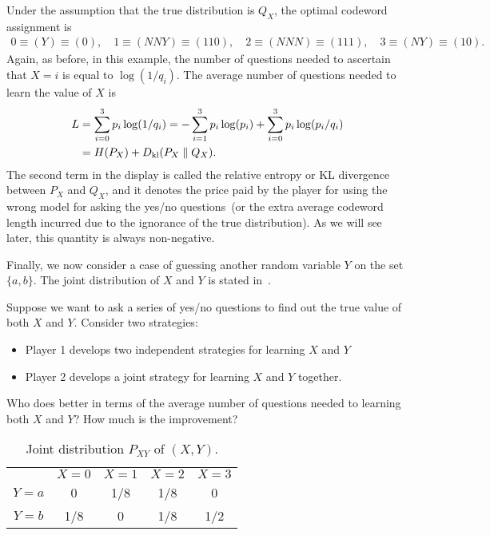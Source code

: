         Under the assumption that the true distribution is $Q_X$, the optimal codeword assignment is 
        \begin{align}
            0 \equiv (Y) \equiv (0), \quad 
            1 \equiv (NNY) \equiv (110), \quad 
            2 \equiv (NNN) \equiv (111), \quad 
            3 \equiv (NY) \equiv (10). 
        \end{align}
        Again, as before, in this example, the number of questions needed to ascertain that $X=i$ is equal to $\log(1/q_i)$. The average number of questions needed to learn the value of $X$ is 
        \begin{align}
            L &= \sum_{i=0}^3 p_i \log(1/q_i) = - \sum_{i=1}^3 p_i\log(p_i) +  \sum_{i=0}^3 p_i \log(p_i/q_i)  \\
            & = H(P_X) + D_{\text{kl}}(P_X \parallel Q_X). 
        \end{align}
        The second term in the display is called the relative entropy or KL divergence between $P_X$ and $Q_X$, and it denotes the price paid by the player for using the wrong model for asking the yes/no questions~(or the extra average codeword length incurred due to the ignorance of the true distribution). As we will see later, this quantity is always non-negative. 

        \begin{question}
            \label{question:guessing-game-IV} Finally, we now consider a case of guessing another random variable $Y$ on the set $\{a, b\}$. The joint distribution of $X$ and $Y$ is stated in~.  

            Suppose we want to ask a series of yes/no questions to find out the true value of both $X$ and $Y$. Consider two strategies: 
            \begin{itemize}
                \item Player 1 develops two  independent strategies for learning $X$ and $Y$ 
                \item Player 2 develops a joint strategy for learning $X$ and $Y$ together. 
            \end{itemize}
            Who does better in terms of the average number of questions needed to learning both $X$ and $Y$? How much is the improvement? 
        \end{question}
        \begin{table}
            \centering
            \begin{tabular}{|c|c|c|c|c|}
                \hline
                & $X=0$ & $X=1$ & $X=2$ & $X=3$  \\
            $Y=a$& 0 & 1/8 & 1/8 & 0 \\
            $Y=b$& 1/8 & 0 & 1/8 & 1/2  \\ 
            \hline 
            \end{tabular}
            \caption{Joint distribution $P_{XY}$ of $(X, Y)$.}
            \label{tab:joint-distribution}
        \end{table}

